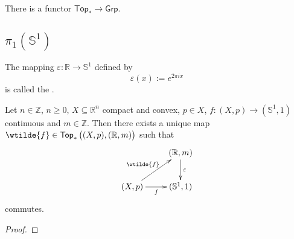 \begin{proposition}
	There is a functor $\mathsf{Top}_\ast \to \mathsf{Grp}$.
\end{proposition}

\subsection*{$\pi_1(\mathbb{S}^1)$} 

\begin{definition}
	The mapping $\varepsilon : \mathbb{R} \to \mathbb{S}^1$ defined by
	\begin{equation}
		\varepsilon(x) := e^{2\pi i x}
	\end{equation}
	\noindent is called the .
\end{definition}

\begin{proposition}
	Let $n \in \mathbb{Z}$, $n \geq 0$, $X \subseteq \mathbb{R}^n$ compact and convex, $p \in X$, $f : (X,p) \to (\mathbb{S}^1,1)$ continuous and $m \in \mathbb{Z}$. Then there exists a unique map $\wtilde{f} \in \mathsf{Top}_\ast\del[1]{(X,p),(\mathbb{R},m)}$ such that 
	\begin{equation*}
		\centering
		\xymatrix{
			& (\mathbb{R},m) \ar[d]^\varepsilon\\
			(X,p) \ar[r]_f\ar[ur]^{\wtilde{f}}	& (\mathbb{S}^1,1)
		}
		\end{equation*}
		\noindent commutes. 
	\end{proposition}

\begin{proof}
	
\end{proof}
